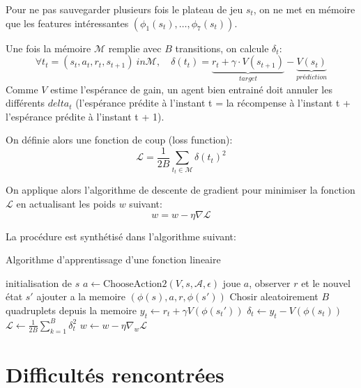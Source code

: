 \documentclass{report}
\begin{document}
Pour ne pas sauvegarder plusieurs fois le plateau de jeu \(s_t\), on ne met en
mémoire que les features intéressantes \( (\phi_1 (s_t), \hdots, \phi_7(s_t)) \).

Une fois la mémoire \( \mathcal{M} \) remplie avec \( B \) transitions, on calcule \( \delta_t \):
\[
\forall t_t = (s_t, a_t, r_t, s_{t+1}) \ in \mathcal{M},\quad
\delta(t_t) = \underbrace{r_t + \gamma \cdot V(s_{t+1})}_{target} -
\underbrace{V(s_{t})}_{prédiction}
\]
Comme \( V \) estime l'espérance de gain, un agent bien entrainé doit annuler
les différents \(delta_t\) (l'espérance prédite à l'instant t = la récompense
à l'instant t + l'espérance prédite à l'instant t + 1).

On définie alors une fonction de coup (loss function):
\[
\mathcal{L} = \frac{1}{2B} \sum _{t_t \in \mathcal{M}} \delta(t_t)^2
\]

On applique alors l'algorithme de descente de gradient pour minimiser la fonction
\( \mathcal{L} \) en actualisant les poids \( w \) suivant:
\[
w = w - \eta \nabla \mathcal{L}
\]

La procédure est synthétisé dans l'algorithme suivant:

\begin{algorithm}[H]
  \caption{Algorithme d'apprentissage d'une fonction lineaire}\label{alg:linfct}
  \begin{algorithmic}
    [1]
    \Repeat{}
    \State{} initialisation de \(s\)
    \Repeat{}
    \State{} \(a \gets \mathup{ChooseAction2}(V, s, \mathcal{A}, \epsilon)\)
    \State{} joue \(a\), observer \(r\) et le nouvel \'etat \(s'\)
    \State{} ajouter a la memoire \( \left(\phi(s), a, r, \phi(s')\right) \)
    \EndFor{}
    \State{} Chosir aleatoirement \(B\) quadruplets depuis la memoire
    \State{} \(y_t \gets r_t + \gamma V\left(\phi(s_t')\right)\)
    \State{} \(\delta_t \gets y_t - V \left(\phi(s_t)\right)\)
    \State{} \(\mathcal{L} \gets \frac{1}{2B}\sum_{k=1}^B \delta_t^2\)
    \State{} \(w \gets w - \eta \nabla_w \mathcal{L}\)
    \EndProcedure{}
  \end{algorithmic}
\end{algorithm}

\chapter{Difficultés rencontrées}
\end{document}
